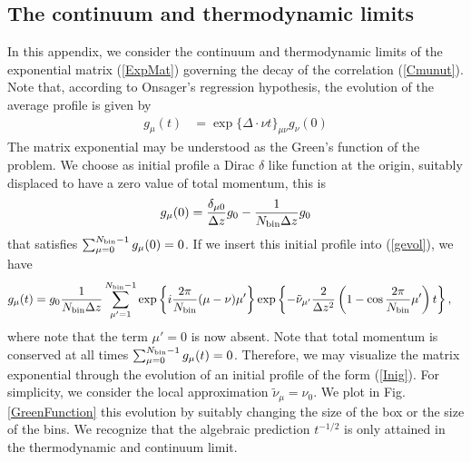 \documentclass[b5paper,openright,10pt]{book}
\newcommand{\esc}{\!\cdot\!}
\begin{document}
\begin{appendices}
\chapter{The continuum and thermodynamic limits}
\label{Ap:Cont}
In this appendix, we consider the continuum and thermodynamic limits of
the  exponential  matrix (\ref{ExpMat})  governing  the  decay of  the
correlation   (\ref{Cmunut}).  Note   that,  according   to  Onsager's
regression hypothesis, the  evolution of the average  profile is given
by
\begin{align}
  g_\mu(t)&=\exp\{\Delta\esc\nu t\}_{\mu\nu}  g_\nu(0)
\label{gevol}
\end{align}
The matrix  exponential may be  understood as the Green's  function of
the problem.  We choose as initial  profile a Dirac $\delta$ like function at
the origin, suitably displaced to have a zero value of total momentum,
this is
\begin{align}
  g_\mu(0)=\frac{\delta_{\mu 0}}{\Delta z}g_0-\frac{1}{{N_{\rm bin}}\Delta z}g_0
\label{Inig}
\end{align}
that  satisfies  $\sum_{\mu=0}^{{N_{\rm bin}}-1}g_\mu(0)=0$.  If  we  insert  this
initial profile into (\ref{gevol}), we have
\begin{align}
  g_\mu(t)&=
g_0\frac{1}{{N_{\rm bin}}\Delta z}\sum_{\mu'=1}^{{N_{\rm bin}}-1}\exp\left\{i\frac{2\pi}{{N_{\rm bin}}}(\mu-\nu)\mu'\right\}
\exp\left\{-\tilde{\nu}_{\mu'}\frac{2}{\Delta z^2}\left(1-\cos\frac{2\pi}{{N_{\rm bin}}}\mu'\right)t\right\},
\label{gmut}
\end{align}
where note  that the  term $\mu'=0$  is now  absent.  Note  that total
momentum   is   conserved    at   all   times   $\sum_{\mu=0}^{{N_{\rm
      bin}}-1}g_\mu(t)=0$.   Therefore, we  may  visualize the  matrix
exponential through  the evolution of  an initial profile of  the form
(\ref{Inig}).   For simplicity,  we consider  the local  approximation
$\tilde{\nu}_\mu=\nu_0$.   We  plot   in  Fig.   \ref{GreenFunction}
this  evolution by suitably changing  the size
of the box or  the size of the bins.  We  recognize that the algebraic
prediction  $t^{-1/2}$  is  only  attained in  the  thermodynamic  and
continuum limit.


\end{appendices}
\end{document}
